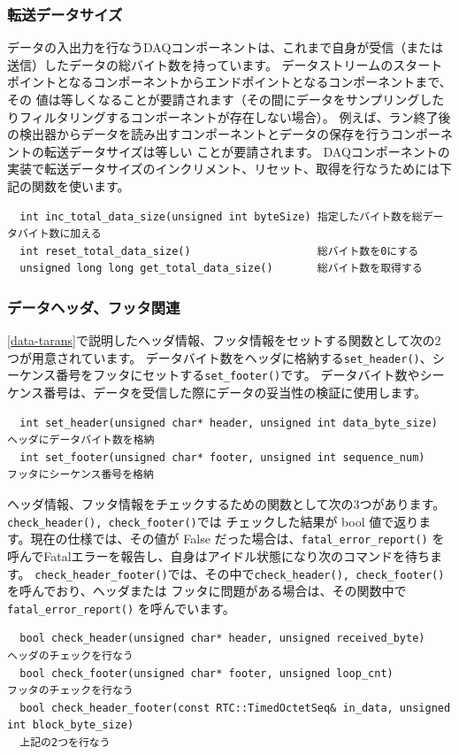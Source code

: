 \documentclass[a4j,10pt,dvips,onecolumn,oneside,final]{jarticle}%
\begin{document}
\subsubsection{転送データサイズ}\label{datasize}
データの入出力を行なうDAQコンポーネントは、これまで自身が受信（または送信）したデータの総バイト数を持っています。
データストリームのスタートポイントとなるコンポーネントからエンドポイントとなるコンポーネントまで、その
値は等しくなることが要請されます（その間にデータをサンプリングしたりフィルタリングするコンポーネントが存在しない場合）。
例えば、ラン終了後の検出器からデータを読み出すコンポーネントとデータの保存を行うコンポーネントの転送データサイズは等しい
ことが要請されます。
DAQコンポーネントの実装で転送データサイズのインクリメント、リセット、取得を行なうためには下記の関数を使います。
\begin{Verbatim}
  int inc_total_data_size(unsigned int byteSize) 指定したバイト数を総データバイト数に加える
  int reset_total_data_size()                    総バイト数を0にする
  unsigned long long get_total_data_size()       総バイト数を取得する
\end{Verbatim}

\subsubsection{データヘッダ、フッタ関連}\label{header}
\ref{data-tarans}で説明したヘッダ情報、フッタ情報をセットする関数として次の2つが用意されています。
データバイト数をヘッダに格納する\verb|set_header()|、シーケンス番号をフッタにセットする\verb|set_footer()|です。
データバイト数やシーケンス番号は、データを受信した際にデータの妥当性の検証に使用します。
\begin{Verbatim}
  int set_header(unsigned char* header, unsigned int data_byte_size) ヘッダにデータバイト数を格納
  int set_footer(unsigned char* footer, unsigned int sequence_num)   フッタにシーケンス番号を格納
\end{Verbatim}

ヘッダ情報、フッタ情報をチェックするための関数として次の3つがあります。\verb|check_header(), check_footer()|では
チェックした結果が bool 値で返ります。現在の仕様では、その値が False だった場合は、\verb|fatal_error_report()| 
を呼んでFatalエラーを報告し、自身はアイドル状態になり次のコマンドを待ちます。
\verb|check_header_footer()|では、その中で\verb|check_header(), check_footer()|を呼んでおり、ヘッダまたは
フッタに問題がある場合は、その関数中で\verb|fatal_error_report()| を呼んでいます。

\begin{Verbatim}
  bool check_header(unsigned char* header, unsigned received_byte)     ヘッダのチェックを行なう
  bool check_footer(unsigned char* footer, unsigned loop_cnt)          フッタのチェックを行なう
  bool check_header_footer(const RTC::TimedOctetSeq& in_data, unsigned int block_byte_size) 
  上記の2つを行なう
\end{Verbatim}
\end{document}
